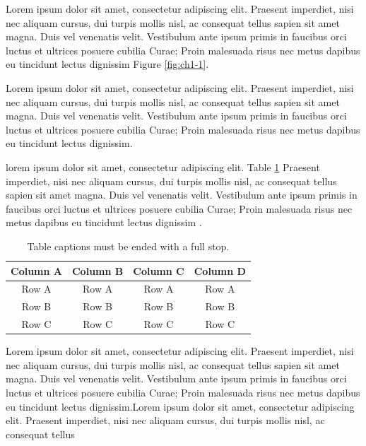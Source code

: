 Lorem ipsum dolor sit amet, consectetur adipiscing elit. Praesent imperdiet, nisi 
nec aliquam cursus, dui turpis mollis nisl, ac consequat tellus sapien sit amet 
magna. Duis vel venenatis velit. Vestibulum ante ipsum primis in faucibus orci 
luctus et ultrices posuere cubilia Curae; Proin malesuada risus nec metus dapibus 
eu tincidunt lectus dignissim Figure \ref{fig:ch1-1}.

Lorem ipsum dolor sit amet, consectetur adipiscing elit. Praesent imperdiet, nisi 
nec aliquam cursus, dui turpis mollis nisl, ac consequat tellus sapien sit amet 
magna. Duis vel venenatis velit. Vestibulum ante ipsum primis in faucibus orci 
luctus et ultrices posuere cubilia Curae; Proin malesuada risus nec metus dapibus 
eu tincidunt lectus dignissim. 

\citet*{harper2007} lorem ipsum dolor sit amet, consectetur adipiscing elit. Table \ref{table:ch1-1} Praesent imperdiet, nisi 
nec aliquam cursus, dui turpis mollis nisl, ac consequat tellus sapien sit amet 
magna. Duis vel venenatis velit. Vestibulum ante ipsum primis in faucibus orci 
luctus et ultrices posuere cubilia Curae; Proin malesuada risus nec metus dapibus 
eu tincidunt lectus dignissim \cite{unesco}.

\vspace{3pt}
\begin{table}[ht]
\centering
\caption{Table captions must be ended with a full stop.}
\setlength{\tabcolsep}{14pt}
\begin{tabular}{cccc}
\toprule\midrule
Column A & Column B & Column C & Column D \\
\midrule
Row A & Row A & Row A & Row A \\
Row B & Row B & Row B & Row B \\
Row C & Row C & Row C & Row C \\
\bottomrule
\end{tabular}
\label{table:ch1-1}
\end{table}
\vspace{-6pt}

Lorem ipsum dolor sit amet, consectetur adipiscing elit. Praesent imperdiet, nisi 
nec aliquam cursus, dui turpis mollis nisl, ac consequat tellus sapien sit amet 
magna. Duis vel venenatis velit. Vestibulum ante ipsum primis in faucibus orci 
luctus et ultrices posuere cubilia Curae; Proin malesuada risus nec metus dapibus 
eu tincidunt lectus dignissim.Lorem ipsum dolor sit amet, consectetur adipiscing elit. 
Praesent imperdiet, nisi nec aliquam cursus, dui turpis mollis nisl, ac consequat 
tellus \cite{mccaffrey88, moore91, nelson88, sisaky, simpsondvd, startrek, TS-40561, url-1, url-2, vanden2001} 

